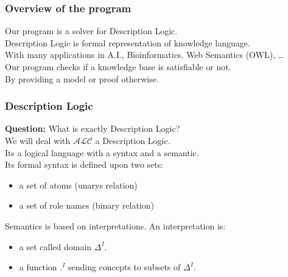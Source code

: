 \begin{frame}
  \frametitle{Overview of the program}
  Our program is a solver for Description Logic. \\
  \pause
  \smallskip
  Description Logic is formal representation of knowledge language. \\
  With many applications in A.I., Bioinformatics, Web Semantics (OWL), \dots \\
  \pause
  \bigskip
  Our program checks if a knowledge base is satisfiable or not. \\
  By providing a model or proof otherwise. \\
\end{frame}

\begin{frame}
\frametitle{Description Logic}
{\bf Question:} What is exactly Description Logic? \\
\pause
\smallskip
We will deal with $\mathcal{ALC}$ a Description Logic. \\
Its a logical language with a syntax and a semantic. \\
\pause \smallskip
Its formal syntax is defined upon two sets:  \\
\begin{itemize}
\item a set of atoms (unarys relation)
\item a set of role names (binary relation)
\end{itemize}
\pause \smallskip
Semantics is based on interpretations. An interpretation is: \\
\begin{itemize}
\item a set called domain $\Delta^{I}$.
\item a function $.^{I}$ sending concepts to subsets of $\Delta^{I}$.
\end{itemize}
\end{frame}

